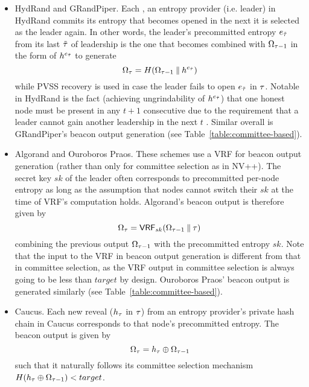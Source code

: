 \begin{itemize}
\item HydRand and GRandPiper. Each \epoch, an entropy provider (i.e. \epoch leader) in HydRand commits its entropy that becomes opened in the next \epoch it is selected as the leader again. In other words, the \epoch leader's precommitted entropy $e_{\tilde{\tau}}$ from its last \epoch $\tilde{\tau}$ of leadership is the one that becomes combined with $\Omega_{\tau - 1}$ in the form of $h^{e_{\tilde{\tau}}}$ to generate
\[
\Omega_\tau = H(\Omega_{\tau - 1} \mathbin\Vert h^{e_{\tilde{\tau}}})
\]
while PVSS recovery is used in case the leader fails to open $e_{\tilde{\tau}}$ in \epoch $\tau$. Notable in HydRand is the fact (achieving ungrindability of $h^{e_{\tilde{\tau}}}$) that one honest node must be present in any $t + 1$ consecutive \epochs due to the requirement that a leader cannot gain another leadership in the next $t$ \epochs. Similar overall is GRandPiper's beacon output generation (see Table~\ref{table:committee-based}).
\item Algorand and Ouroboros Praos. These schemes use a VRF for beacon output generation (rather than only for committee selection as in NV++). The secret key $sk$ of the \epoch leader often corresponds to precommitted per-node entropy as long as the assumption that nodes cannot switch their $sk$ at the time of VRF's computation holds. Algorand's beacon output is therefore given by
\[
\Omega_\tau = \textsf{VRF}_{sk}(\Omega_{\tau - 1} \mathbin\Vert \tau)
\]
combining the previous output $\Omega_{\tau - 1}$ with the precommitted entropy $sk$. Note that the input to the VRF in beacon output generation is different from that in committee selection, as the VRF output in committee selection is always going to be less than $target$ by design. Ouroboros Praos' beacon output is generated similarly (see Table~\ref{table:committee-based}).
\item Caucus. Each new reveal ($h_\tau$ in \epoch $\tau$) from an entropy provider's private hash chain in Caucus corresponds to that node's precommitted entropy. The beacon output is given by
\[
\Omega_\tau = h_\tau \oplus \Omega_{\tau - 1}
\]
such that it naturally follows its committee selection mechanism $H(h_\tau \oplus \Omega_{\tau - 1}) < target$.
\end{itemize}
